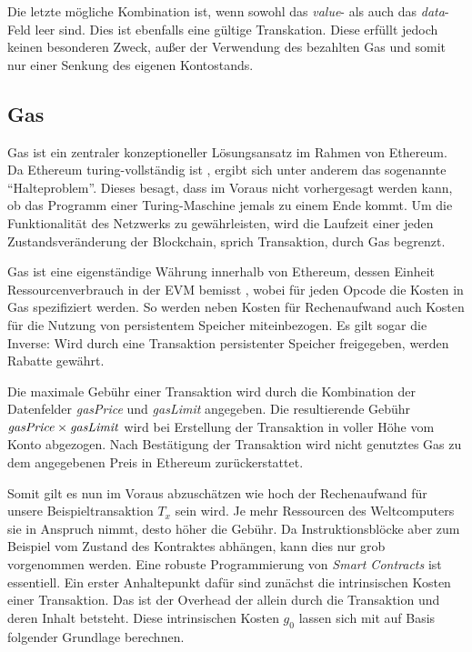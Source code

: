 \documentclass[runningheads]{llncs}
\begin{document}
Die letzte mögliche Kombination ist, wenn sowohl das \textit{value}- als auch das \textit{data}-Feld leer sind. Dies ist ebenfalls eine gültige Transkation. Diese erfüllt jedoch keinen besonderen Zweck, außer der Verwendung des bezahlten Gas und somit nur einer Senkung des eigenen Kontostands.

\subsection{Gas}
\label{gas}
Gas ist ein zentraler konzeptioneller Lösungsansatz im Rahmen von Ethereum. Da Ethereum turing-vollständig ist \cite[S. 1]{wood_ethereum/yellowpaper_2019}, ergibt sich unter anderem das sogenannte "`Halteproblem"'. Dieses besagt, dass im Voraus nicht vorhergesagt werden kann, ob das Programm einer Turing-Maschine jemals zu einem Ende kommt. \cite[S.70]{davis_computability_2013} Um die Funktionalität des Netzwerks zu gewährleisten, wird die Laufzeit einer jeden Zustandsveränderung der Blockchain, sprich Transaktion, durch Gas begrenzt.

Gas ist eine eigenständige Währung innerhalb von Ethereum, dessen Einheit Ressourcenverbrauch in der EVM bemisst \cite[S. 9:3]{m.spain_oasics-tokeneconomics_2019}, wobei für jeden Opcode die Kosten in Gas spezifiziert werden. \cite[S. 25 ff.]{wood_ethereum/yellowpaper_2019} So werden neben Kosten für Rechenaufwand auch Kosten für die Nutzung von persistentem Speicher miteinbezogen. Es gilt sogar die Inverse: Wird durch eine Transaktion persistenter Speicher freigegeben, werden Rabatte gewährt.

Die maximale Gebühr einer Transaktion wird durch die Kombination der Datenfelder \textit{gasPrice} und \textit{gasLimit} angegeben. Die resultierende Gebühr $ \text{\textit{gasPrice}} \times \text{\textit{gasLimit}} $ wird bei Erstellung der Transaktion in voller Höhe vom Konto abgezogen. Nach Bestätigung der Transaktion wird nicht genutztes Gas zu dem angegebenen Preis in Ethereum zurückerstattet.

Somit gilt es nun im Voraus abzuschätzen wie hoch der Rechenaufwand für unsere Beispieltransaktion $ T_x $ sein wird. Je mehr Ressourcen des Weltcomputers sie in Anspruch nimmt, desto höher die Gebühr. Da Instruktionsblöcke aber zum Beispiel vom Zustand des Kontraktes abhängen, kann dies nur grob vorgenommen werden. Eine robuste Programmierung von \textit{Smart Contracts} ist essentiell. Ein erster Anhaltepunkt dafür sind zunächst die intrinsischen Kosten einer Transaktion. Das ist der Overhead der allein durch die Transaktion und deren Inhalt betsteht. Diese intrinsischen Kosten $ g_0 $ lassen sich mit auf Basis folgender Grundlage berechnen.
\end{document}
